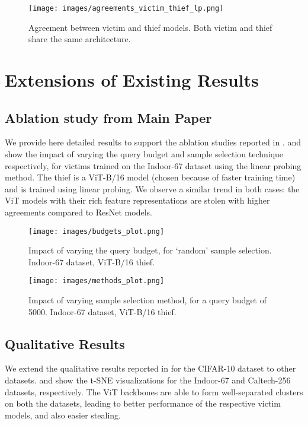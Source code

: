 \begin{figure}[t]
	\centering
	\texttt{[image: images/agreements\_victim\_thief\_lp.png]}	
	\caption{Agreement between victim and thief models. Both victim and thief share the same architecture.}
	\label{fig:victim_equals_thief}
\end{figure}


\section{Extensions of Existing Results} 

\subsection{Ablation study from Main Paper} We provide here detailed results to support the ablation studies reported in .  and  show the impact of varying the query budget and sample selection technique respectively, for victims trained on the Indoor-67 dataset using the linear probing method. The thief is a ViT-B/16 model (chosen because of faster training time) and is trained using linear probing. We observe a similar trend in both cases: the ViT models with their rich feature representations are stolen with higher agreements compared to ResNet models. 

\begin{figure}[t]
	\centering
	\begin{minipage}{.47\textwidth}
		\centering
		\texttt{[image: images/budgets\_plot.png]}	
		\caption{Impact of varying the query budget, for `random' sample selection. Indoor-67 dataset, ViT-B/16 thief.}
		\label{fig:ablation1}
	\end{minipage}%
	\qquad
	\begin{minipage}{0.47\textwidth}
		\centering
		\texttt{[image: images/methods\_plot.png]}
		\caption{Impact of varying sample selection method, for a query budget of 5000. Indoor-67 dataset, ViT-B/16 thief.}
		\label{fig:ablation2}
	\end{minipage}
\end{figure}

\subsection{Qualitative Results}
We extend the qualitative results reported in  for the CIFAR-10 dataset to other datasets.  and  show the t-SNE visualizations for the Indoor-67 and Caltech-256 datasets, respectively. The ViT backbones are able to form well-separated clusters on both the datasets, leading to better performance of the respective victim models, and also easier stealing. 


